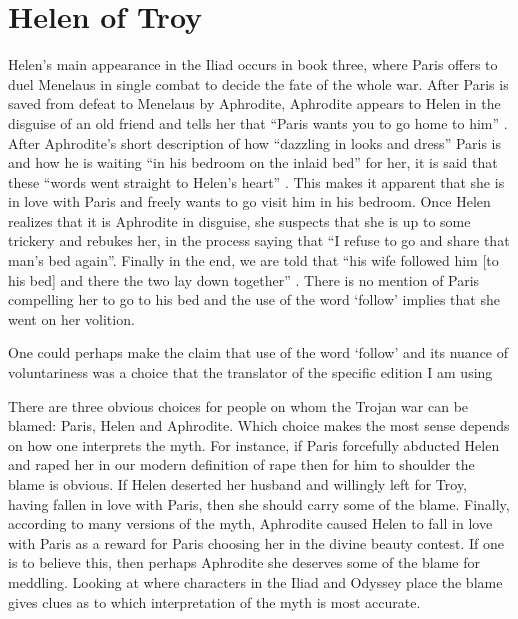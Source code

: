 \documentclass[11pt]{article}
\begin{document}
\section{Helen of Troy}
Helen's main appearance in the Iliad occurs in book three, where Paris offers to duel Menelaus in single combat to decide the fate of the whole war.
After Paris is saved from defeat to Menelaus by Aphrodite, Aphrodite appears to Helen in the disguise of an old friend and tells her that ``Paris wants you to go home to him'' \cite[book 3, line 390]{iliad}.
After Aphrodite's short description of how ``dazzling in looks and dress'' Paris is and how he is waiting ``in his bedroom on the inlaid bed'' for her, it is said that these ``words went straight to Helen's heart'' \cite[book 3, line 391]{iliad}.
This makes it apparent that she is in love with Paris and freely wants to go visit him in his bedroom.
Once Helen realizes that it is Aphrodite in disguise, she suspects that she is up to some trickery and rebukes her, in the process saying that ``I refuse to go and share that man's bed again''.
Finally in the end, we are told that ``his wife followed him [to his bed] and there the two lay down together'' \cite[book 3, line 448]{iliad}.
There is no mention of Paris compelling her to go to his bed and the use of the word `follow' implies that she went on her volition.


One could perhaps make the claim that use of the word `follow' and its nuance of voluntariness was a choice that the translator of the specific edition I am using


There are three obvious choices for people on whom the Trojan war can be blamed: Paris, Helen and Aphrodite.
Which choice makes the most sense depends on how one interprets the myth.
For instance, if Paris forcefully abducted Helen and raped her in our modern definition of rape then for him to shoulder the blame is obvious.
If Helen deserted her husband and willingly left for Troy, having fallen in love with Paris, then she should carry some of the blame.
Finally, according to many versions of the myth, Aphrodite caused Helen to fall in love with Paris as a reward for Paris choosing her in the divine beauty contest.
If one is to believe this, then perhaps Aphrodite she deserves some of the blame for meddling.
Looking at where characters in the Iliad and Odyssey place the blame gives clues as to which interpretation of the myth is most accurate.
\end{document}
